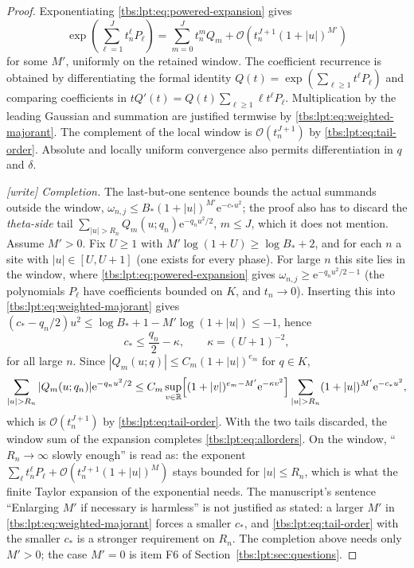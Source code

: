 \documentclass[11pt,a4paper]{article}
\numberwithin{equation}{section}
\theoremstyle{definition}
\newcommand{\R}{\mathbb R}
\newcommand{\ee}{\mathrm e}
\newcommand{\OO}{\mathcal O}
\begin{document}
\begin{proof}
Exponentiating \eqref{tbs:lpt:eq:powered-expansion} gives
\[
 \exp\!\left(\sum_{\ell=1}^{J}t_n^\ell P_\ell\right)
 =\sum_{m=0}^{J}t_n^m Q_m+\OO\!\left(t_n^{J+1}(1+|u|)^{M'}\right)
\]
for some $M'$, uniformly on the retained window. The coefficient
recurrence is obtained by differentiating the formal identity
$Q(t)=\exp(\sum_{\ell\ge1}t^\ell P_\ell)$ and comparing coefficients in
$tQ'(t)=Q(t)\sum_{\ell\ge1}\ell t^\ell P_\ell$. Multiplication by the
leading Gaussian and summation are justified termwise by
\eqref{tbs:lpt:eq:weighted-majorant}. The complement of the local window
is $\OO(t_n^{J+1})$ by \eqref{tbs:lpt:eq:tail-order}. Absolute and
locally uniform convergence also permits differentiation in $q$ and
$\delta$.

\emph{[write] Completion.} The last-but-one sentence bounds the actual
summands outside the window, $\omega_{n,j}\le
B_*(1+|u|)^{M'}\ee^{-c_*u^2}$; the proof also has to discard the
\emph{theta-side} tail
$\sum_{|u|>R_n}Q_m(u;q_n)\ee^{-q_nu^2/2}$, $m\le J$, which it does not
mention. Assume $M'>0$. Fix $U\ge1$ with
$M'\log(1+U)\ge\log B_*+2$, and for each $n$ a site with
$|u|\in[U,U+1]$ (one exists for every phase). For large $n$ this site
lies in the window, where \eqref{tbs:lpt:eq:powered-expansion} gives
$\omega_{n,j}\ge\ee^{-q_nu^2/2-1}$ (the polynomials $P_\ell$ have
coefficients bounded on $K$, and $t_n\to0$). Inserting this into
\eqref{tbs:lpt:eq:weighted-majorant} gives
$(c_*-q_n/2)u^2\le\log B_*+1-M'\log(1+|u|)\le-1$, hence
\[
 c_*\le\frac{q_n}2-\kappa,\qquad \kappa=(U+1)^{-2},
\]
for all large $n$. Since $|Q_m(u;q)|\le C_m(1+|u|)^{e_m}$ for $q\in K$,
\[
 \sum_{|u|>R_n}|Q_m(u;q_n)|\ee^{-q_nu^2/2}
 \le C_m\sup_{v\in\R}\Bigl[(1+|v|)^{e_m-M'}\ee^{-\kappa v^2}\Bigr]
 \sum_{|u|>R_n}(1+|u|)^{M'}\ee^{-c_*u^2},
\]
which is $\OO(t_n^{J+1})$ by \eqref{tbs:lpt:eq:tail-order}. With the two
tails discarded, the window sum of the expansion completes
\eqref{tbs:lpt:eq:allorders}. On the window, ``$R_n\to\infty$ slowly
enough'' is read as: the exponent
$\sum_\ell t_n^\ell P_\ell+\OO(t_n^{J+1}(1+|u|)^M)$ stays bounded for
$|u|\le R_n$, which is what the finite Taylor expansion of the exponential
needs. The manuscript's sentence ``Enlarging $M'$ if necessary is
harmless'' is not justified as stated: a larger $M'$ in
\eqref{tbs:lpt:eq:weighted-majorant} forces a smaller $c_*$, and
\eqref{tbs:lpt:eq:tail-order} with the smaller $c_*$ is a stronger
requirement on $R_n$. The completion above needs only $M'>0$; the case
$M'=0$ is item F6 of Section~\ref{tbs:lpt:sec:questions}.
\end{proof}
\end{document}
